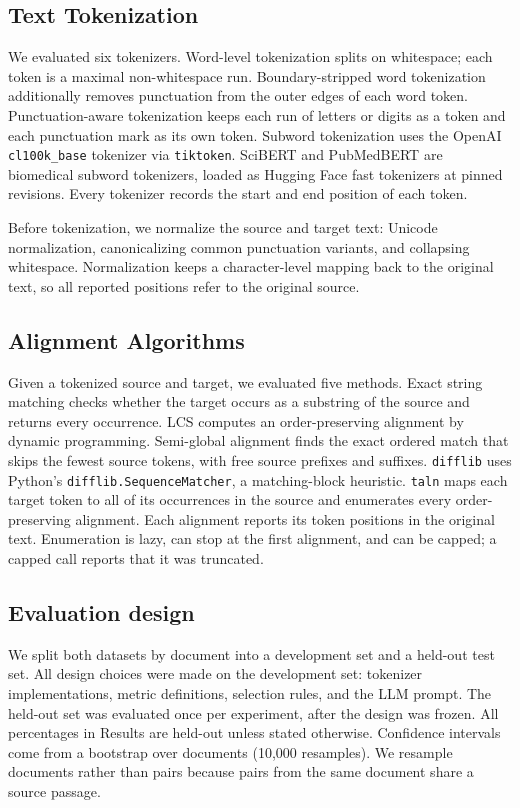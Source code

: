 \documentclass[10pt,twocolumn]{article}
\theoremstyle{plain}
\theoremstyle{definition}
\theoremstyle{remark}
\begin{document}
\subsection{Text Tokenization}
We evaluated six tokenizers. Word-level tokenization splits on whitespace; each token is a maximal non-whitespace run. Boundary-stripped word tokenization additionally removes punctuation from the outer edges of each word token. Punctuation-aware tokenization keeps each run of letters or digits as a token and each punctuation mark as its own token. Subword tokenization uses the OpenAI \texttt{cl100k\_base} tokenizer via \texttt{tiktoken}. SciBERT and PubMedBERT are biomedical subword tokenizers, loaded as Hugging Face fast tokenizers at pinned revisions. Every tokenizer records the start and end position of each token.

Before tokenization, we normalize the source and target text: Unicode normalization, canonicalizing common punctuation variants, and collapsing whitespace. Normalization keeps a character-level mapping back to the original text, so all reported positions refer to the original source.

\subsection{Alignment Algorithms}
Given a tokenized source and target, we evaluated five methods. Exact string matching checks whether the target occurs as a substring of the source and returns every occurrence. LCS computes an order-preserving alignment by dynamic programming. Semi-global alignment finds the exact ordered match that skips the fewest source tokens, with free source prefixes and suffixes. \texttt{difflib} uses Python's \texttt{difflib.SequenceMatcher}, a matching-block heuristic. \texttt{taln} maps each target token to all of its occurrences in the source and enumerates every order-preserving alignment. Each alignment reports its token positions in the original text. Enumeration is lazy, can stop at the first alignment, and can be capped; a capped call reports that it was truncated.

\subsection{Evaluation design}
We split both datasets by document into a development set and a held-out test set. All design choices were made on the development set: tokenizer implementations, metric definitions, selection rules, and the LLM prompt. The held-out set was evaluated once per experiment, after the design was frozen. All percentages in Results are held-out unless stated otherwise. Confidence intervals come from a bootstrap over documents (10,000 resamples). We resample documents rather than pairs because pairs from the same document share a source passage.
\end{document}
